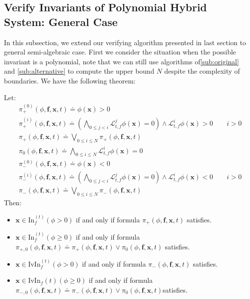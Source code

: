 \documentclass{jssc}
\begin{document}
\subsection{Verify Invariants of Polynomial Hybrid System: General Case}
In this subsection, we extend our verifying algorithm presented in last section to general semi-algebraic case. First we consider the situation when the possible invariant is a polynomial, note that we can still use algorithms of\ref{sub:original} and \ref{sub:alternative} to compute the upper bound $N$ despite the complexity of boundaries. We have the following theorem:
\begin{theorem}
Let:
	\begin{align*}
		&\pi^{(0)}_+(\phi, \boldsymbol{f}, \boldsymbol{x}, t) \doteq \phi(\boldsymbol{x}) > 0 \\
		&\pi^{(i)}_+(\phi, \boldsymbol{f}, \boldsymbol{x}, t) \doteq (\bigwedge_{0 \leq j < i} \mathcal{L}_{t, f}^j \phi(\boldsymbol{x}) = 0) \wedge \mathcal{L}_{t, f}^i \phi(\boldsymbol{x}) > 0 \qquad i > 0 \\
		&\pi_+(\phi, \boldsymbol{f}, \boldsymbol{x}, t) \doteq \bigvee_{0 \leq i \leq N} \pi_+(\phi, \boldsymbol{f}, \boldsymbol{x}, t) \\
		&\pi_0(\phi, \boldsymbol{f}, \boldsymbol{x}, t) \doteq \bigwedge_{0 \leq i \leq N} \mathcal{L}_{t,f}^i \phi(\boldsymbol{x}) = 0 \\
		&\pi^{(0)}_-(\phi, \boldsymbol{f}, \boldsymbol{x}, t) \doteq \phi(\boldsymbol{x}) < 0 \\
		&\pi^{(i)}_-(\phi, \boldsymbol{f}, \boldsymbol{x}, t) \doteq (\bigwedge_{0 \leq j < i} \mathcal{L}_{t, f}^j \phi(\boldsymbol{x}) = 0) \wedge \mathcal{L}_{t, f}^i \phi(\boldsymbol{x}) < 0 \qquad i > 0 \\
		&\pi_-(\phi, \boldsymbol{f}, \boldsymbol{x}, t) \doteq \bigvee_{0 \leq i \leq N} \pi_-(\phi, \boldsymbol{f}, \boldsymbol{x}, t)
	\end{align*}
Then:
	\begin{itemize}
		\item $\boldsymbol{x} \in \mathrm{In}_f^{(t)}(\phi > 0)$ if and only if formula $\pi_+(\phi, \boldsymbol{f}, \boldsymbol{x}, t)$ satisfies.
		\item $\boldsymbol{x} \in \mathrm{In}_f^{(t)}(\phi \geq 0)$ if and only if formula $\pi_{+,0}(\phi, \boldsymbol{f}, \boldsymbol{x}, t) \doteq \pi_+(\phi, \boldsymbol{f}, \boldsymbol{x}, t) \vee \pi_0(\phi, \boldsymbol{f}, \boldsymbol{x}, t)$ satisfies.
		\item $\boldsymbol{x} \in \mathrm{IvIn}_f^{(t)}(\phi > 0)$ if and only if formula $\pi_-(\phi, \boldsymbol{f}, \boldsymbol{x}, t)$ satisfies.
		\item $\boldsymbol{x} \in \mathrm{IvIn}_f{(t)}(\phi \geq 0)$ if and only if formula $\pi_{-,0}(\phi, \boldsymbol{f}, \boldsymbol{x}, t) \doteq \pi_-(\phi, \boldsymbol{f}, \boldsymbol{x}, t) \vee \pi_0(\phi, \boldsymbol{f}, \boldsymbol{x}, t)$satisfies.
	\end{itemize}
\end{theorem}
\end{document}
